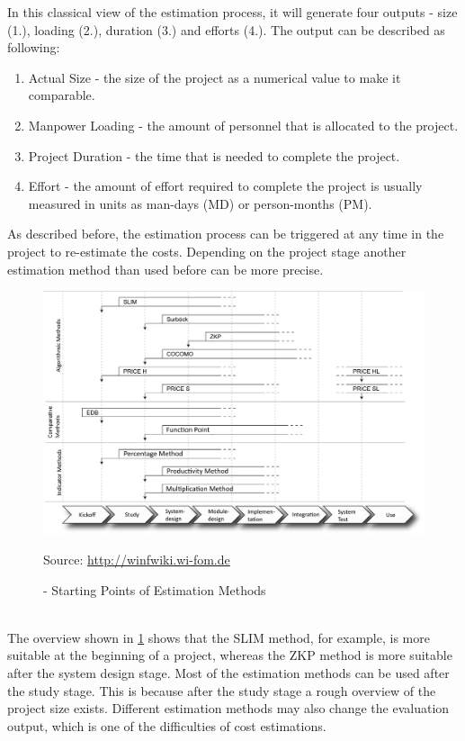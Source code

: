 In this classical view of the estimation process, it will generate four outputs - size (1.), loading (2.), duration (3.) and efforts (4.). The output can be described as following:
\begin{enumerate}
	\item Actual Size - the size of the project as a numerical value to make it comparable.
	\item Manpower Loading - the amount of personnel that is allocated to the project.
	\item Project Duration - the time that is needed to complete the project.
	\item Effort - the amount of effort required to complete the project is usually measured in units as man-days (MD) or person-months (PM).
\end{enumerate}
As described before, the estimation process can be triggered at any time in the project to re-estimate the costs. Depending on the project stage another estimation method than used before can be more precise.\\
\begin{figure}[h] 
	\centering 
	\includegraphics[width=13cm]{images/Einsatzzeitpunkte2.PNG} 
	\caption{- Starting Points of Estimation Methods} 
	Source: \url{http://winfwiki.wi-fom.de}
	\label{fig:estimationMethodInStage}
\end{figure}\\
The overview shown in \ref{fig:estimationMethodInStage} shows that the SLIM method, for example, is more suitable at the beginning of a project, whereas the ZKP method is more suitable after the system design stage. Most of the estimation methods can be used after the study stage. This is because after the study stage a rough overview of the project size exists. Different estimation methods may also change the evaluation output, which is one of the difficulties of cost estimations.\\

